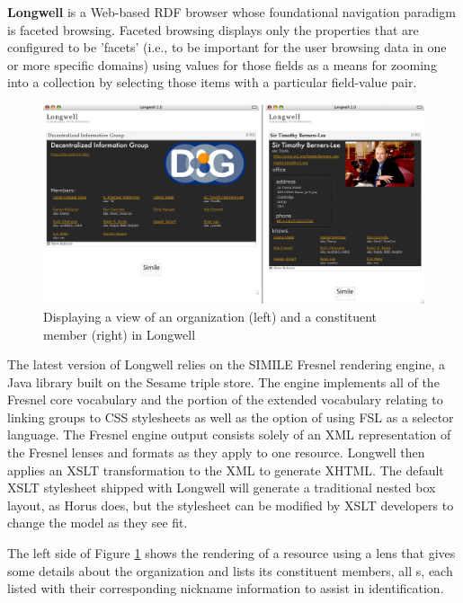 \vspace{1em}
{\bf Longwell} is a Web-based RDF browser whose foundational navigation paradigm is faceted browsing. Faceted browsing displays only the properties that are configured to be 'facets' (i.e., to be important for the user browsing data in one or more specific domains) using values for those fields as a means for zooming into a collection by selecting those items with a particular field-value pair.

\begin{figure}
\begin{center}
\includegraphics[width=12cm]{longwellScreens.png}
\end{center}
\vspace{-2em}
\caption{Displaying a view of an organization (left) and a constituent member (right) in Longwell}
\label{longwellFig1}
\vspace{-1em}
\end{figure}

The latest version of Longwell relies on the SIMILE Fresnel rendering engine, a Java library built on the Sesame triple store. The engine implements all of the Fresnel core vocabulary and the portion of the extended vocabulary relating to linking groups to CSS stylesheets as well as the option of using FSL as a selector language.
The Fresnel engine output consists solely of an XML representation of the Fresnel lenses and formats as they apply to one resource. Longwell then applies an XSLT transformation to the XML to generate XHTML.  The default XSLT stylesheet shipped with Longwell will generate a traditional nested box layout, as Horus does, but the stylesheet can be modified by XSLT developers to change the model as they see fit.

The left side of Figure \ref{longwellFig1} shows the rendering of a  resource using a lens that gives some details about the organization and lists its constituent members, all s, each listed with their corresponding nickname information to assist in identification.

